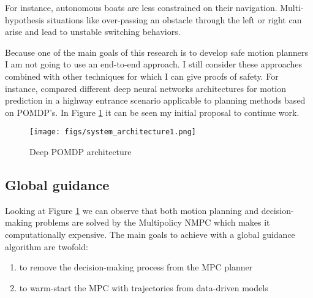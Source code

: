 For instance, autonomous boats are less constrained on their navigation. Multi-hypothesis situations like over-passing an obstacle through the left or right can arise and lead to unstable switching behaviors.

Because one of the main goals of this research is to develop safe motion planners I am not going to use an end-to-end approach. I still consider these approaches combined with other techniques for which I can give proofs of safety. For instance, \citeauthor{Lenz2017} compared different deep neural networks architectures for motion prediction in a highway entrance scenario applicable to planning methods based on POMDP's. In Figure \ref{fig:init_architecture} it can be seen my initial proposal to continue \citeauthor{Zhou} work.

\begin{figure}[h]
	\centering 
	\texttt{[image: figs/system\_architecture1.png]}
	\caption{Deep POMDP architecture}
	\label{fig:init_architecture}
\end{figure}


\subsection{Global guidance}
Looking at Figure \ref{fig:init_architecture} we can observe that both motion planning and decision-making problems are solved by the Multipolicy NMPC which makes it computationally expensive. The main goals to achieve with a global guidance algorithm are twofold: 

\begin{enumerate}
    \item to remove the decision-making process from the MPC planner
    \item to warm-start the MPC with trajectories from data-driven models \cite{mansard}
\end{enumerate}

